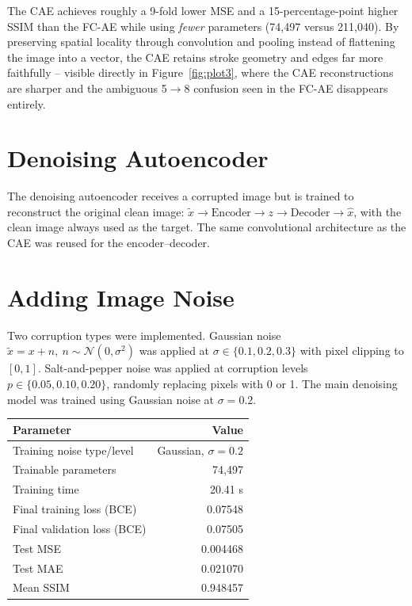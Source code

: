 \documentclass[10pt]{article}
\begin{document}
The CAE achieves roughly a 9-fold lower MSE and a 15-percentage-point higher SSIM than the FC-AE while
using \emph{fewer} parameters (74{,}497 versus 211{,}040). By preserving spatial locality through
convolution and pooling instead of flattening the image into a vector, the CAE retains stroke geometry
and edges far more faithfully -- visible directly in Figure~\ref{fig:plot3}, where the CAE reconstructions are sharper
and the ambiguous 5$\to$8 confusion seen in the FC-AE disappears entirely.

\section{Denoising Autoencoder}

The denoising autoencoder receives a corrupted image but is trained to reconstruct the original clean
image: $\tilde{x} \rightarrow \text{Encoder} \rightarrow z \rightarrow \text{Decoder} \rightarrow
\hat{x}$, with the clean image always used as the target. The same convolutional architecture as the CAE
was reused for the encoder--decoder.

\section{Adding Image Noise}

Two corruption types were implemented. Gaussian noise $\tilde{x} = x + n,\ n\sim\mathcal{N}(0,\sigma^2)$
was applied at $\sigma \in \{0.1, 0.2, 0.3\}$ with pixel clipping to $[0,1]$. Salt-and-pepper noise
was applied at corruption levels $p \in \{0.05, 0.10, 0.20\}$, randomly replacing pixels with 0 or 1. The
main denoising model was trained using Gaussian noise at $\sigma = 0.2$.

\begin{center}
\begin{tabular}{|l|r|}
\hline
\textbf{Parameter} & \textbf{Value}\\
\hline
Training noise type/level & Gaussian, $\sigma=0.2$\\
Trainable parameters & 74{,}497\\
Training time & 20.41 s\\
Final training loss (BCE) & 0.07548\\
Final validation loss (BCE) & 0.07505\\
Test MSE & 0.004468\\
Test MAE & 0.021070\\
Mean SSIM & 0.948457\\
\hline
\end{tabular}
\end{center}
\end{document}
